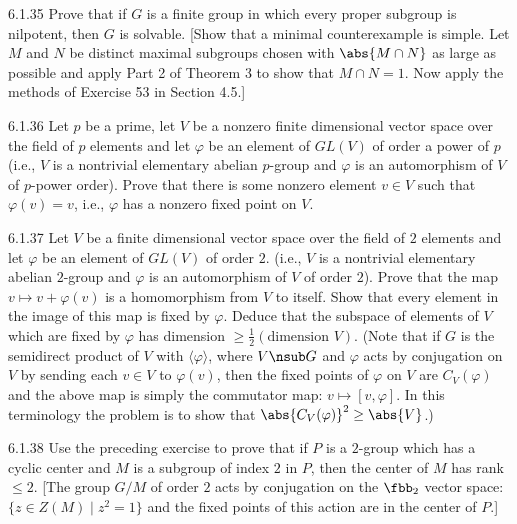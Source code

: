 \begin{exercise}{6.1.35}
    Prove that if $G$ is a finite group in which every proper subgroup is nilpotent, then $G$ is solvable.
    [Show that a minimal counterexample is simple.
    Let $M$ and $N$ be distinct maximal subgroups chosen with $\abs{M \cap N}$ as large as possible and apply Part 2 of Theorem 3 to show that $M \cap N = 1$.
    Now apply the methods of Exercise 53 in Section 4.5.]
\end{exercise}

\begin{exercise}{6.1.36}
    Let $p$ be a prime, let $V$ be a nonzero finite dimensional vector space over the field of $p$ elements and let $\varphi$ be an element of $GL(V)$ of order a power of $p$ (i.e., $V$ is a nontrivial elementary abelian $p$-group and $\varphi$ is an automorphism of $V$ of $p$-power order).
    Prove that there is some nonzero element $v \in V$ such that $\varphi(v) = v$, i.e., $\varphi$ has a nonzero fixed point on $V$.
\end{exercise}

\begin{exercise}{6.1.37}
    Let $V$ be a finite dimensional vector space over the field of $2$ elements and let $\varphi$ be an element of $GL(V)$ of order $2$. (i.e., $V$ is a nontrivial elementary abelian $2$-group and $\varphi$ is an automorphism of $V$ of order $2$).
    Prove that the map $v \mapsto v + \varphi(v)$ is a homomorphism from $V$ to itself.
    Show that every element in the image of this map is fixed by $\varphi$.
    Deduce that the subspace of elements of $V$ which are fixed by $\varphi$ has dimension $\geq \frac{1}{2}(\text{dimension } V)$.
    (Note that if $G$ is the semidirect product of $V$ with $\langle \varphi \rangle$, where $V \nsub G$ and $\varphi$ acts by conjugation on $V$ by sending each $v \in V$ to $\varphi(v)$, then the fixed points of $\varphi$ on $V$ are $C_V(\varphi)$ and the above map is simply the commutator map: $v \mapsto [v, \varphi]$.
    In this terminology the problem is to show that $\abs{C_V(\varphi)}^2 \geq \abs{V}$.)
\end{exercise}

\begin{exercise}{6.1.38}
    Use the preceding exercise to prove that if $P$ is a $2$-group which has a cyclic center and $M$ is a subgroup of index $2$ in $P$, then the center of $M$ has rank $\leq 2$.
    [The group $G/M$ of order $2$ acts by conjugation on the $\fbb_2$ vector space: $\{z \in Z(M) \mid z^2 = 1\}$ and the fixed points of this action are in the center of $P$.]
\end{exercise}